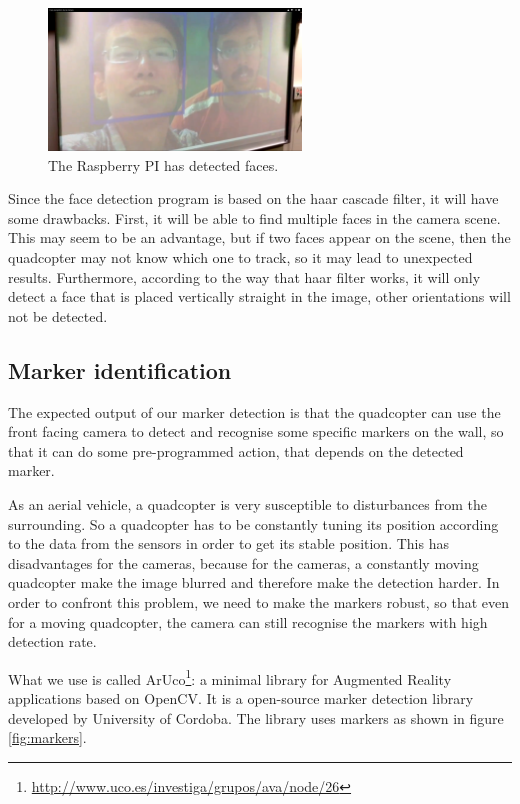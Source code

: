 \documentclass[11pt, a4paper, onecolumn, oneside, parskip=half]{scrartcl}
\begin{document}
\begin{figure}[ht]
\centering
\includegraphics[width=0.6\textwidth]{image02}
\caption{The Raspberry PI has detected faces.}
\label{fig:raspifaces}
\end{figure}

Since the face detection program is based on the haar cascade filter, it will have some drawbacks. First, it will be able to find multiple faces in the camera scene. This may seem to be an advantage, but if two faces appear on the scene, then the quadcopter may not know which one to track, so it may lead to unexpected results. Furthermore, according to the way that haar filter works, it will only detect a face that is placed vertically straight in the image, other orientations will not be detected.

\subsection{Marker identification}
\label{sec:objectives:marker}
The expected output of our marker detection is that the quadcopter can use the front facing camera to detect and recognise some specific markers on the wall, so that it can do some pre-programmed action, that depends on the detected marker. 

As an aerial vehicle, a quadcopter is very susceptible to disturbances from the surrounding. So a quadcopter has to be constantly tuning its position according to the data from the sensors in order to get its stable position. This has disadvantages for the cameras, because for the cameras, a constantly moving quadcopter make the image blurred and therefore make the detection harder. In order to confront this problem, we need to make the markers robust, so that even for a moving quadcopter, the camera can still recognise the markers with high detection rate.

What we use is called ArUco\footnote{\url{http://www.uco.es/investiga/grupos/ava/node/26}}: a minimal library for Augmented Reality applications based on OpenCV. It is a open-source marker detection library developed by University of Cordoba. The library uses markers as shown in figure \ref{fig:markers}.
\end{document}
